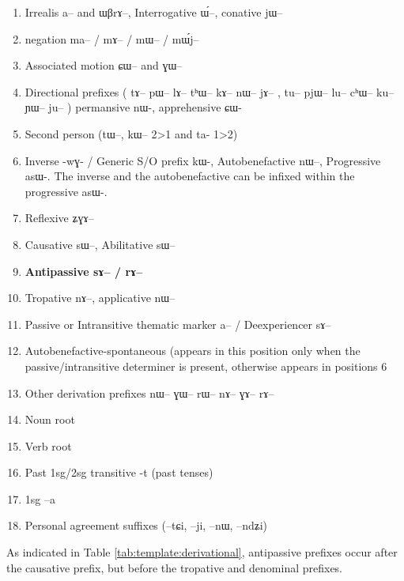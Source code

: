 \documentclass[oldfontcommands,oneside,a4paper,11pt]{article}
\newcommand{\ipa}[1]{{\phon \mbox{#1}}} %
\begin{document}
\begin{landscape}
\begin{multicols}{2}
\begin{enumerate}
\item Irrealis  \ipa{a}-- and \ipa{ɯβrɤ}--, Interrogative \ipa{ɯ́}--, conative \ipa{jɯ}--
\item negation \ipa{ma}-- / \ipa{mɤ}-- / \ipa{mɯ}-- / \ipa{mɯ́j}--
\item Associated motion \ipa{ɕɯ}-- and \ipa{ɣɯ}--
\item Directional prefixes ( \ipa{tɤ}--  \ipa{pɯ}--  \ipa{lɤ}--   \ipa{tʰɯ}--  \ipa{kɤ}--   \ipa{nɯ}--   \ipa{jɤ}-- ,  \ipa{tu}--   \ipa{pjɯ}--   \ipa{lu}--   \ipa{cʰɯ}--   \ipa{ku}--   \ipa{ɲɯ}--   \ipa{ju}-- ) permansive  \ipa{nɯ}-, apprehensive \ipa{ɕɯ}-
\item Second person (\ipa{tɯ}--, \ipa{kɯ}-- 2>1 and ta- 1>2)
\item Inverse -\ipa{wɣ}- / Generic S/O prefix \ipa{kɯ}-, Autobenefactive \ipa{nɯ--}, Progressive \ipa{asɯ}-. The inverse and the autobenefactive can be infixed within the progressive \ipa{asɯ}-.
\item Reflexive \ipa{ʑɣɤ}-- 
\item Causative \ipa{sɯ}--, Abilitative \ipa{sɯ}--
\item \textbf{ Antipassive  \ipa{sɤ}-- / \ipa{rɤ}--}
\item  Tropative \ipa{nɤ}--, applicative \ipa{nɯ}--
\item Passive or Intransitive thematic marker \ipa{a}-- / Deexperiencer \ipa{sɤ}--
\item Autobenefactive-spontaneous (appears in this position only when the passive/intransitive determiner is present, otherwise appears in positions 6 
\item Other derivation prefixes \ipa{nɯ}-- \ipa{ɣɯ}-- \ipa{rɯ}-- \ipa{nɤ}-- \ipa{ɣɤ}-- \ipa{rɤ}--
\item Noun root
\item Verb root 
\item Past 1sg/2sg transitive -\ipa{t} (past tenses)
\item 1sg --\ipa{a}
\item Personal agreement suffixes (--\ipa{tɕi}, --\ipa{ji}, --\ipa{nɯ}, --\ipa{ndʑi})
\end{enumerate}


\end{multicols}
  \end{landscape}


As indicated in Table \ref{tab:template:derivational}, antipassive prefixes occur after the causative prefix, but before the tropative and denominal prefixes.
\end{document}
